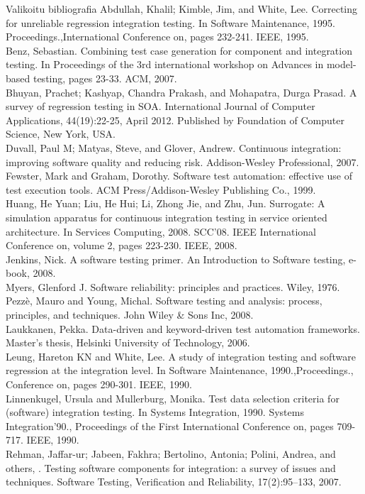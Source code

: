 \documentclass{beamer}
\begin{document}
\begin{frame}[allowframebreaks]{Valikoitu bibliografia} 
\tiny
Abdullah, Khalil; Kimble, Jim, and White, Lee. Correcting for unreliable regression integration testing. In Software Maintenance, 1995. Proceedings.,International Conference on, pages 232-241. IEEE, 1995.
\\[0.1in]
Benz, Sebastian. Combining test case generation for component and integration testing. In Proceedings of the 3rd international workshop on Advances in model-based testing, pages 23-33. ACM, 2007.
\\[0.1in]
Bhuyan, Prachet; Kashyap, Chandra Prakash, and Mohapatra, Durga Prasad. A survey of regression testing in SOA. International Journal of Computer Applications, 44(19):22-25, April 2012. Published by Foundation of Computer Science, New York, USA.
\\[0.1in]
Duvall, Paul M; Matyas, Steve, and Glover, Andrew. Continuous integration:
improving software quality and reducing risk. Addison-Wesley Professional,
2007.
\\[0.1in]
Fewster, Mark and Graham, Dorothy. Software test automation: effective use of
test execution tools. ACM Press/Addison-Wesley Publishing Co., 1999.
\\[0.1in]
Huang, He Yuan; Liu, He Hui; Li, Zhong Jie, and Zhu, Jun. Surrogate: A simulation apparatus for continuous integration testing in service oriented architecture. In Services Computing, 2008. SCC'08. IEEE International Conference on, volume 2, pages 223-230. IEEE, 2008.
\\[0.1in]
Jenkins, Nick. A software testing primer. An Introduction to Software testing, e-book, 2008.
\\[0.1in]
Myers, Glenford J. Software reliability: principles and practices. Wiley, 1976.
Pezzè, Mauro and Young, Michal. Software testing and analysis: process, principles, and techniques. John Wiley & Sons Inc, 2008.
\\[0.1in]
Laukkanen, Pekka. Data-driven and keyword-driven test automation frameworks. Master’s thesis, Helsinki University of Technology, 2006.
\\[0.1in]
Leung, Hareton KN and White, Lee. A study of integration testing and software regression at the integration level. In Software Maintenance, 1990.,Proceedings., Conference on, pages 290-301. IEEE, 1990.
\\[0.1in]
Linnenkugel, Ursula and Mullerburg, Monika. Test data selection criteria for (software) integration testing. In Systems Integration, 1990. Systems Integration'90., Proceedings of the First International Conference on, pages 709-717. IEEE, 1990.
\\[0.1in]
Rehman, Jaffar-ur; Jabeen, Fakhra; Bertolino, Antonia; Polini, Andrea, and others, . Testing software components for integration: a survey of issues and techniques. Software Testing, Veriﬁcation and Reliability, 17(2):95–133,
2007.
% 

\end{frame} 
\end{document}

